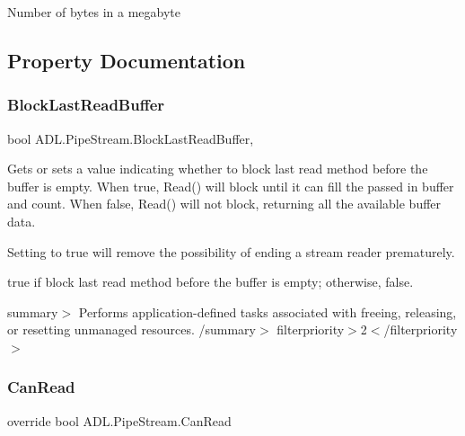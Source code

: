 Number of bytes in a megabyte 



\subsection{Property Documentation}
\mbox{\label{class_a_d_l_1_1_pipe_stream_af05e530e849bfee481290e8139f27379}} 
\subsubsection{\texorpdfstring{Block\+Last\+Read\+Buffer}{BlockLastReadBuffer}}
{\footnotesize\ttfamily bool A\+D\+L.\+Pipe\+Stream.\+Block\+Last\+Read\+Buffer\hspace{0.3cm}{\ttfamily [get]}, {\ttfamily [set]}}



Gets or sets a value indicating whether to block last read method before the buffer is empty. When true, Read() will block until it can fill the passed in buffer and count. When false, Read() will not block, returning all the available buffer data. 

Setting to true will remove the possibility of ending a stream reader prematurely. 

{\ttfamily true} if block last read method before the buffer is empty; otherwise, {\ttfamily false}. 

summary$>$ Performs application-\/defined tasks associated with freeing, releasing, or resetting unmanaged resources. /summary$>$ filterpriority$>$2$<$/filterpriority$>$ \mbox{\label{class_a_d_l_1_1_pipe_stream_a194eae1c5b19a0999a5d12bcef00efd9}} 
\subsubsection{\texorpdfstring{Can\+Read}{CanRead}}
{\footnotesize\ttfamily override bool A\+D\+L.\+Pipe\+Stream.\+Can\+Read\hspace{0.3cm}{\ttfamily [get]}}

